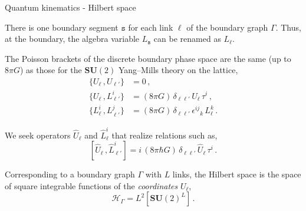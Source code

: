 \documentclass[12pt,titlepage]{article}
\begin{document}


\begin{frame}{Quantum kinematics - Hilbert space}
    \begin{list}{\,}{\leftmargin=1em \itemindent=0em}
        \item<1-> There is one boundary segment $\mathtt{s}$ for each link $\ell$ of the boundary graph $\Gamma$. Thus, at the boundary, the algebra variable $L_\mathtt{s}$ can be renamed as $L_\ell$.
        \item<2-> The Poisson brackets of the discrete boundary phase space are the same (up to $8\pi G$) as those for the $\mathbf{SU}(2)$ Yang–Mills theory on the lattice,
        \begin{align}
            \{U_\ell\,,U_{\ell'}\}&=0\,,\\
            \{U_{\ell}\,,L^i_{\ell'}\}&=(8\pi G)\, \delta_{\ell\ell'}\,U_\ell\,\tau^i\,,\\
            \{L^i_{\ell}\,,L^j_{\ell'}\}&=(8\pi G)\, \delta_{\ell\ell'}\,{\epsilon^{ij}}_k\, L^k_{\ell}\,.
        \end{align}
        \item<3-> We seek operators $\hat{U}_\ell$ and $\hat{L}^i_\ell$ that realize relations such as,
        \begin{equation}\label{3d_comm}
            [\hat{U}_{\ell}\,,\hat{L}^i_{\ell'}]=i\,(8\pi\hbar G)\, \delta_{\ell\ell'}\,\hat{U}_\ell\,\tau^i\,.
        \end{equation}
        \item<4-> Corresponding to a boundary graph $\Gamma$ with $L$ links, the Hilbert space is the space of square integrable functions of the \textit{coordinates} $U_\ell$,
        \begin{equation}
            \mathcal{H}_\Gamma=L^2[{\mathbf{SU}(2)}^L]\,.
        \end{equation}
    \end{list}
\end{frame}
\end{document}

